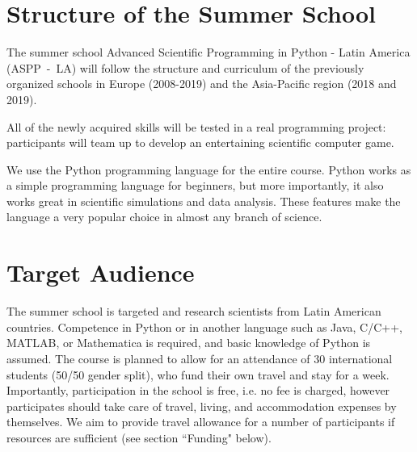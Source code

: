 \documentclass{article}[11pt]
\begin{document}
\section*{Structure of the Summer School}
The summer school Advanced Scientific Programming in Python - Latin America
(ASPP~-~LA) will follow the structure and curriculum of the previously
organized schools in Europe (2008-2019) and the Asia-Pacific region (2018 and
2019).

 All of the newly acquired skills will
be tested in a real programming project: participants will team up to develop
an entertaining scientific computer game.

We use the Python programming language for the entire course. Python works as a
simple programming language for beginners, but more importantly, it also works
great in scientific simulations and data analysis. These features make the
language a very popular choice in almost any branch of science. 

\section*{Target Audience}
The summer school is targeted  
and research scientists from Latin American countries. Competence in Python or
in another language such as Java, C/C++, MATLAB, or Mathematica is required,
and basic knowledge of Python is assumed. The course is planned to allow for an
attendance of 30 international students (50/50 gender split), who fund their
own travel and stay for a week. Importantly, participation in the school is
free, i.e. no fee is charged, however participates should take care of travel,
living, and accommodation expenses by themselves. We aim to provide travel
allowance for a number of participants if resources are sufficient (see section
``Funding" below).
\end{document}
